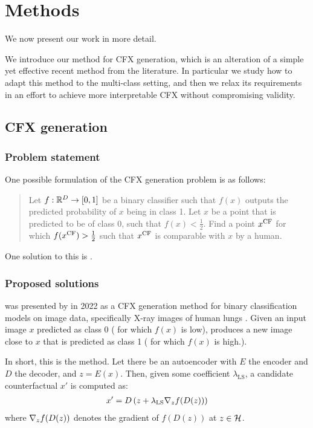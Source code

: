 \documentclass[../main.tex]{subfiles}
\begin{document}
\chapter{Methods}
\label{ch:methods}

We now present our work in more detail.

We introduce our method for CFX generation, which is an alteration of a simple yet effective recent method from the literature.
In particular we study how to adapt this method to the multi-class setting, and then
we relax its requirements in an effort to achieve more interpretable CFX without compromising validity.

\section{CFX generation}

\subsection{Problem statement}

One possible formulation of the CFX generation problem is as follows:
\begin{quote}
Let $f: \R^\inputdim \to [0, 1]$ be a binary classifier such that $f(x)$ outputs the predicted probability of $x$ being in class 1.
Let $x$ be a point that is predicted to be of class 0, \ie{} such that $f(x) < \frac{1}{2}$.
Find a point $\CF{x}$ for which $f(\CF{x}) > \frac{1}{2}$ such that $\CF{x}$ is comparable with $x$ by a human.
\end{quote}

One solution to this is \ls{}.

\subsection{Proposed solutions}
\label{methods:0_sols}

\ls{} was presented by \citeauthor{cohenGifsplanation2022} in 2022 as a CFX generation method for binary classification models on image data, specifically X-ray images of human lungs \cite{cohenGifsplanation2022}.
Given an input image $x$ predicted as class 0 (\ie{} for which $f(x)$ is low), \ls{} produces a new image close to $x$ that is predicted as class 1 (\ie{} for which $f(x)$ is high.).

In short, this is the method.
Let there be an autoencoder with $E$ the encoder and $D$ the decoder, and $z = E(x)$.
Then, given some coefficient $\lambda_\text{LS}$, a candidate counterfactual $x'$ is computed as:
\begin{align*}
    x' = D \left( z + \lambda_\text{LS} \grad{f(D(z))}{z} \right)
\end{align*} 
where $\grad{f(D(z))}{z}$ denotes the gradient of $f(D(z))$ at $z \in \latentspace$.
\end{document}
